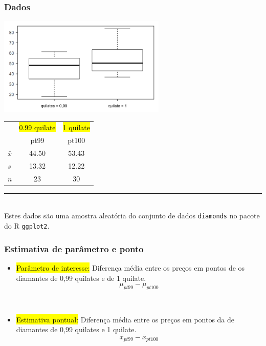 \begin{frame}[fragile]
\frametitle{Dados}

\begin{center}
\includegraphics[width=0.6\textwidth]{5-3_diff_two_mean/diamondBox.png}
\end{center}

{\small
\begin{center}
\begin{tabular}{l | c | c}
		& {\footnotesize \hl{0.99 quilate}} &  {\footnotesize \hl{1 quilate}}  \\
		& pt99	& pt100 \\
\hline
$\bar{x}$	& 44.50		& 53.43 \\
$s$		& 13.32		& 12.22 \\
$n$		& 23			& 30
\end{tabular}
\end{center}
}

\vfill

\rule{2.5cm}{0.25pt} \\
\justifying
{\tiny Estes dados são uma amostra aleatória do conjunto de dados \texttt {diamonds} no pacote do R \texttt {ggplot2}.}

\end{frame}


\begin{frame}
\frametitle{Estimativa de parâmetro e ponto}

\begin{itemize}
\justifying
\item \hl{Parâmetro de interesse:} Diferença média entre os preços em pontos de  os diamantes de 0,99 quilates e de 1 quilate.
\[ \mu_{pt99} - \mu_{pt100} \]

$\:$ \\

\pause
\justifying
\item \hl{Estimativa pontual:} Diferença média entre os preços em pontos da  de diamantes de 0,99 quilates e 1 quilate.
\[ \bar{x}_{pt99} - \bar{x}_{pt100} \]

\end{itemize}

\end{frame}

